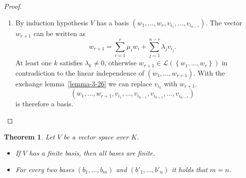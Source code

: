 \documentclass[a4paper,landscape,twocolumn]{article}
\newcommand\set[1]{\left\{#1\right\}}
\newtheorem{theorem}{Theorem}[section]
\begin{document}
\begin{proof}
\begin{description}
\begin{enumerate}
        \item
          By induction hypothesis $V$ has a basis $(w_1, \ldots, w_r, v_{i_1}, \ldots, v_{i_{n-r}})$.
          The vector $w_{r+1}$ can be written as
          \[ w_{r+1} = \sum_{i=1}^r \mu_i w_i + \sum_{j=1}^{n-r} \lambda_j v_{i_j}. \]
          At least one $k$ satisfies $\lambda_k \neq 0$, otherwise $w_{r+1} \in \mathcal L(\set{w_1, \ldots, w_r})$
          in contradiction to the linear independence of $(w_1, \ldots, w_{r+1})$.
          With the exchange lemma~\ref{lemma-3-26} we can replace $v_{i_k}$ with $w_{r+1}$.
          \[ (w_1, \ldots, w_{r+1}, v_{i_1}, \ldots, v_{i_{k-1}}, v_{i_{k+1}}, \ldots, v_{i_{n-r}}) \]
          is therefore a basis.
%
%
      \end{enumerate}
  \end{description}
\end{proof}
%
\begin{theorem}
  Let $V$ be a vector space over $K$.
  \begin{itemize}
    \item If $V$ has a finite basis, then all bases are finite.
    \item For every two bases $(b_1, \dots, b_m)$ and $(b'_1, \dots, b'_n)$ it holds that $m = n$.
  \end{itemize}
\end{theorem}
\end{document}
